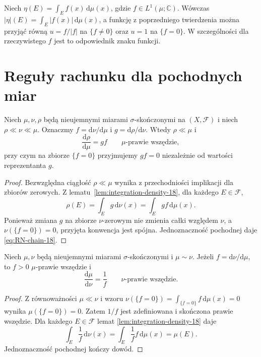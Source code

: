 \begin{przyklad}
Niech $\eta(E)=\int_E f(x)\,\mathrm d\mu(x)$,
gdzie $f\in L^1(\mu;\mathbb C)$. Wówczas
$|\eta|(E)=\int_E|f(x)|\,\mathrm d\mu(x)$,
a funkcję z poprzedniego twierdzenia można przyjąć
równą $u=f/|f|$ na $\{f\neq0\}$ oraz $u=1$
na $\{f=0\}$. W szczególności dla rzeczywistego $f$
jest to odpowiednik znaku funkcji.
\end{przyklad}

\section{Reguły rachunku dla pochodnych miar}
\begin{twierdzenie}
\label{thm:RN-chain-18}
Niech $\mu,\nu,\rho$ będą nieujemnymi miarami
$\sigma$-skończonymi na $(X,\mathcal F)$
i niech $\rho\ll\nu\ll\mu$.
Oznaczmy $f=\mathrm d\nu/\mathrm d\mu$
i $g=\mathrm d\rho/\mathrm d\nu$.
Wtedy $\rho\ll\mu$ i
\begin{equation}\label{eq:RN-chain-18}
\frac{\mathrm d\rho}{\mathrm d\mu}
=g f\qquad\mu\text{-prawie wszędzie},
\end{equation}
przy czym na zbiorze $\{f=0\}$ przyjmujemy $gf=0$
niezależnie od wartości reprezentanta $g$.
\end{twierdzenie}
\begin{proof}
Bezwzględna ciągłość $\rho\ll\mu$ wynika
z przechodniości implikacji dla zbiorów zerowych.
Z lematu~\ref{lem:integration-density-18}, dla każdego
$E\in\mathcal F$,
\[
\rho(E)=\int_Eg\,\mathrm d\nu(x)
=\int_Eg f\,\mathrm d\mu(x).
\]
Ponieważ zmiana $g$ na zbiorze $\nu$-zerowym nie zmienia
całki względem $\nu$, a $\nu(\{f=0\})=0$,
przyjęta konwencja jest spójna. Jednoznaczność
pochodnej daje \eqref{eq:RN-chain-18}.
\end{proof}

\begin{twierdzenie}
\label{thm:RN-inverse-18}
Niech $\mu,\nu$ będą nieujemnymi miarami
$\sigma$-skończonymi i $\mu\sim\nu$.
Jeżeli $f=\mathrm d\nu/\mathrm d\mu$, to
$f>0$ $\mu$-prawie wszędzie i
\begin{equation}\label{eq:RN-inverse-18}
\frac{\mathrm d\mu}{\mathrm d\nu}=\frac1f
\qquad\nu\text{-prawie wszędzie}.
\end{equation}
\end{twierdzenie}
\begin{proof}
Z równoważności $\mu\ll\nu$ i wzoru
$\nu(\{f=0\})=\int_{\{f=0\}}f\,\mathrm d\mu(x)=0$
wynika $\mu(\{f=0\})=0$. Zatem $1/f$ jest
zdefiniowana i skończona prawie wszędzie.
Dla każdego $E\in\mathcal F$ lemat
\ref{lem:integration-density-18} daje
\[
\int_E\frac1f\,\mathrm d\nu(x)
=\int_E\frac1f f\,\mathrm d\mu(x)=\mu(E).
\]
Jednoznaczność pochodnej kończy dowód.
\end{proof}

